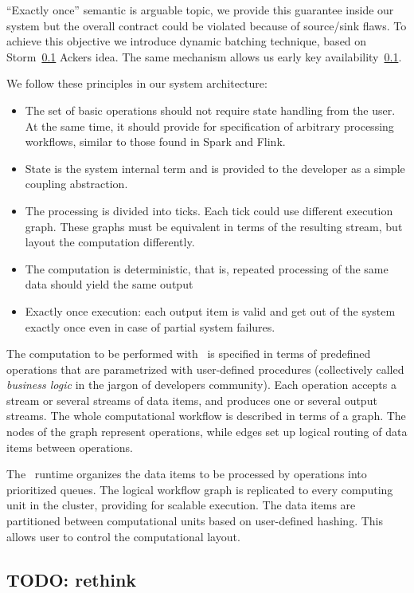 ``Exactly once'' semantic is arguable topic, we provide this guarantee inside our system but the overall contract could be violated because of source/sink flaws. To achieve this objective we introduce dynamic batching technique, based on Storm~\ref{} Ackers idea. The same mechanism allows us early key availability~\ref{}. 

We follow these principles in our system architecture:

\begin{itemize}
\item The set of basic operations should not require state handling from the user. At the same time, it should provide for specification of arbitrary processing workflows, similar to those found in Spark and Flink.
\item State is the system internal term and is provided to the developer as a simple coupling abstraction.
\item The processing is divided into ticks. Each tick could use different execution graph. These graphs must be equivalent in terms of the resulting stream, but layout the computation differently.
\item The computation is deterministic, that is, repeated processing of the same data should yield the same output
\item Exactly once execution: each output item is valid and get out of the system exactly once even in case of partial system failures.
\end{itemize}

The computation to be performed with \FlameStream\ is specified in terms of predefined operations that are parametrized with user-defined procedures (collectively called {\em business logic} in the jargon of developers community). Each operation accepts a stream or several streams of data items, and produces one or several output streams. The whole computational workflow is described in terms of a graph. The nodes of the graph represent operations, while edges set up logical routing of data items between operations.

The \FlameStream\ runtime organizes the data items to be processed by operations into prioritized queues. The logical workflow graph is replicated to every computing unit in the cluster, providing for scalable execution. The data items are partitioned between computational units based on user-defined hashing. This allows user to control the computational layout.

\subsection{TODO: rethink}

